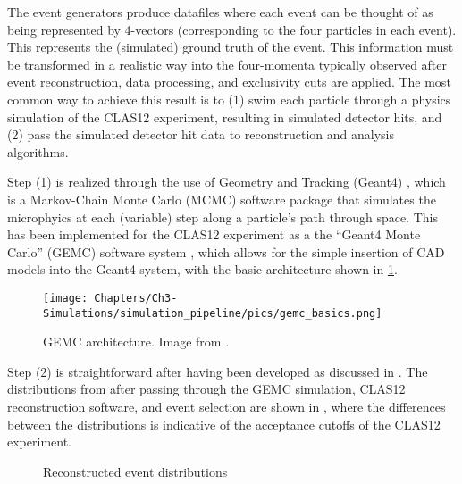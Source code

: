 The event generators produce datafiles where each event can be thought of as being represented by 4-vectors (corresponding to the four particles in each event). This represents the (simulated) ground truth of the event. This information must be transformed in a realistic way into the four-momenta typically observed after event reconstruction, data processing, and exclusivity cuts are applied. The most common way to achieve this result is to (1) swim each particle through a physics simulation of the CLAS12 experiment, resulting in simulated detector hits, and (2) pass the simulated detector hit data to reconstruction and analysis algorithms. 

Step (1) is realized through the use of Geometry and Tracking (Geant4) \parencite{Agostinelli2003Geant4aToolkit}, which is a Markov-Chain Monte Carlo (MCMC) software package that simulates the microphyics at each (variable) step along a particle's path through space. This has been implemented for the CLAS12 experiment as a the ``Geant4 Monte Carlo'' (GEMC) software system \parencite{Ungaro2020TheSimulation}, which allows for the simple insertion of CAD models into the Geant4 system, with the basic architecture shown in \ref{fig:gemc_architecture}. 

\begin{figure}[htb]
    \centering
    \texttt{[image: Chapters/Ch3-Simulations/simulation\_pipeline/pics/gemc\_basics.png]}
    \caption[GEMC Architecture]{GEMC architecture. Image from \parencite{Ungaro2020TheSimulation}.}
    \label{fig:gemc_architecture}
\end{figure}

Step (2) is straightforward after having been developed as discussed in . The distributions from  after passing through the GEMC simulation, CLAS12 reconstruction software, and event selection are shown in , where the differences between the distributions is indicative of the acceptance cutoffs of the CLAS12 experiment. 


    \begin{figure}[H]
        \centering
        \hfill
        \caption[Reconstructed Event Distributions]{Reconstructed event distributions}\label{fig:aao_norad_sim}
    \end{figure}

\iffalse
    
    Event generation - fortran and c++ python wrapped
    geant4 docker gemc sysem
    reconstruction from part 2
    
    CLAASana
    
    this should talk about Geant4, GEMC, microphysics MCMC

\fi


    
        
